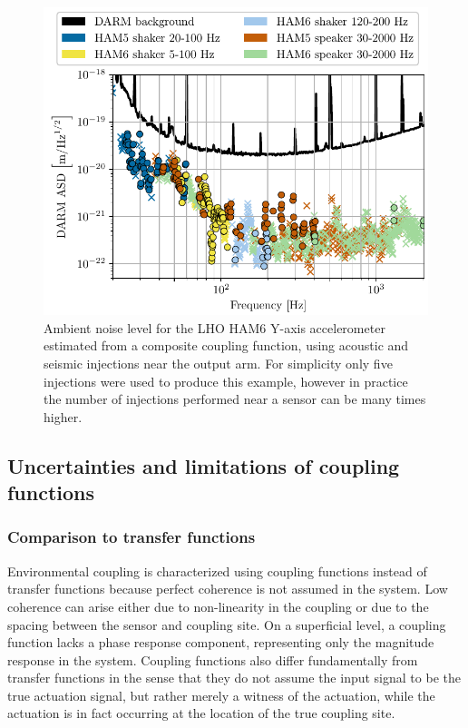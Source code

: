 \begin{figure}
	\centering
	\includegraphics{figures/composite.pdf}
	\caption{
		Ambient noise level for the \ac{LHO} HAM6 Y-axis accelerometer estimated from a composite coupling function, using acoustic and seismic injections near the output arm.
		For simplicity only five injections were used to produce this example, however in practice the number of injections performed near a sensor can be many times higher.}
	\label{fig:composite}
\end{figure}

\subsection{Uncertainties and limitations of coupling functions}\label{subsec:uncertainties}

\subsubsection{Comparison to transfer functions}

Environmental coupling is characterized using coupling functions instead of transfer functions because perfect coherence is not assumed in the system.
Low coherence can arise either due to non-linearity in the coupling or due to the spacing between the sensor and coupling site.
On a superficial level, a coupling function lacks a phase response component, representing only the magnitude response in the system.
Coupling functions also differ fundamentally from transfer functions in the sense that they do not assume the input signal to be the true actuation signal, but rather merely a witness of the actuation, while the actuation is in fact occurring at the location of the true coupling site.

